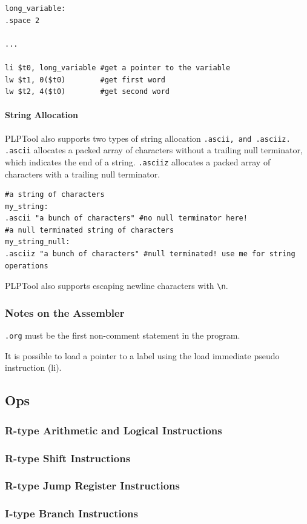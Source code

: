\documentclass{article}
\begin{document}
\begin{verbatim}
long_variable:
.space 2

...

li $t0, long_variable #get a pointer to the variable
lw $t1, 0($t0)        #get first word
lw $t2, 4($t0)        #get second word
\end{verbatim}

\paragraph{String Allocation}
PLPTool also supports two types of string allocation
\verb+.ascii, and .asciiz. .ascii+
allocates a packed array of characters without a trailing null 
terminator, which indicates the end of a string.
\verb+.asciiz+ allocates a packed array of characters with a trailing 
null terminator. 

\begin{verbatim}
#a string of characters
my_string:
.ascii "a bunch of characters" #no null terminator here!
#a null terminated string of characters
my_string_null:
.asciiz "a bunch of characters" #null terminated! use me for string operations
\end{verbatim}
PLPTool also supports escaping newline characters with \verb+\n+. 
\subsubsection{Notes on the Assembler}
\verb+.org+ must be the first non-comment statement in the program.

It is possible to load a pointer to a label using the load immediate pseudo instruction (li). 
\subsection{Ops}
\subsubsection{R-type Arithmetic and Logical Instructions}
\subsubsection{R-type Shift Instructions}
\subsubsection{R-type Jump Register Instructions}
\subsubsection{I-type Branch Instructions}
\end{document}
